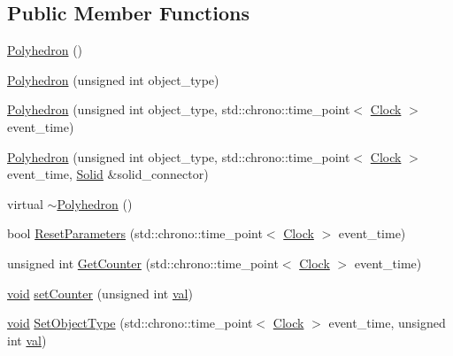 \subsection*{Public Member Functions}
\begin{DoxyCompactItemize}
\item 
\mbox{\hyperlink{class_polyhedron_aebdf7ee85eb636069bf93afb4e6a483f}{Polyhedron}} ()
\item 
\mbox{\hyperlink{class_polyhedron_a304950efef7fb67203d8136578b42535}{Polyhedron}} (unsigned int object\+\_\+type)
\item 
\mbox{\hyperlink{class_polyhedron_a29a4fff595cdb6a557e5f62255e61192}{Polyhedron}} (unsigned int object\+\_\+type, std\+::chrono\+::time\+\_\+point$<$ \mbox{\hyperlink{universe_8h_a0ef8d951d1ca5ab3cfaf7ab4c7a6fd80}{Clock}} $>$ event\+\_\+time)
\item 
\mbox{\hyperlink{class_polyhedron_af5bb1d2a6b04502dfdbfc9f04aafc950}{Polyhedron}} (unsigned int object\+\_\+type, std\+::chrono\+::time\+\_\+point$<$ \mbox{\hyperlink{universe_8h_a0ef8d951d1ca5ab3cfaf7ab4c7a6fd80}{Clock}} $>$ event\+\_\+time, \mbox{\hyperlink{class_solid}{Solid}} \&solid\+\_\+connector)
\item 
virtual \mbox{\hyperlink{class_polyhedron_a3ad3df8be901a55ddcd97128ac890473}{$\sim$\+Polyhedron}} ()
\item 
bool \mbox{\hyperlink{class_polyhedron_ae90c347cfb8ca8028a260e88bef2b45c}{Reset\+Parameters}} (std\+::chrono\+::time\+\_\+point$<$ \mbox{\hyperlink{universe_8h_a0ef8d951d1ca5ab3cfaf7ab4c7a6fd80}{Clock}} $>$ event\+\_\+time)
\item 
unsigned int \mbox{\hyperlink{class_polyhedron_a021ec67f2040f8ec26df64e4b9370521}{Get\+Counter}} (std\+::chrono\+::time\+\_\+point$<$ \mbox{\hyperlink{universe_8h_a0ef8d951d1ca5ab3cfaf7ab4c7a6fd80}{Clock}} $>$ event\+\_\+time)
\item 
\mbox{\hyperlink{glad_8h_a950fc91edb4504f62f1c577bf4727c29}{void}} \mbox{\hyperlink{class_polyhedron_ad74a1ccc28a08bc2dbc186e5f2c1f694}{set\+Counter}} (unsigned int \mbox{\hyperlink{glad_8h_a26942fd2ed566ef553eae82d2c109c8f}{val}})
\item 
\mbox{\hyperlink{glad_8h_a950fc91edb4504f62f1c577bf4727c29}{void}} \mbox{\hyperlink{class_polyhedron_a014c8f981aef5fa1d70dcb5be6a0875a}{Set\+Object\+Type}} (std\+::chrono\+::time\+\_\+point$<$ \mbox{\hyperlink{universe_8h_a0ef8d951d1ca5ab3cfaf7ab4c7a6fd80}{Clock}} $>$ event\+\_\+time, unsigned int \mbox{\hyperlink{glad_8h_a26942fd2ed566ef553eae82d2c109c8f}{val}})
\item 

\end{DoxyCompactItemize}
